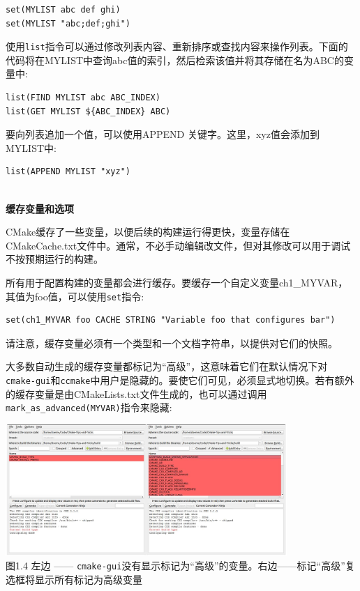 \begin{lstlisting}[style=styleCMake]
set(MYLIST abc def ghi)
set(MYLIST "abc;def;ghi")
\end{lstlisting}

使用\texttt{list}指令可以通过修改列表内容、重新排序或查找内容来操作列表。下面的代码将在MYLIST中查询abc值的索引，然后检索该值并将其存储在名为ABC的变量中:

\begin{lstlisting}[style=styleCMake]
list(FIND MYLIST abc ABC_INDEX)
list(GET MYLIST ${ABC_INDEX} ABC)
\end{lstlisting}

要向列表追加一个值，可以使用APPEND 关键字。这里，xyz值会添加到MYLIST中:

\begin{lstlisting}[style=styleCMake]
list(APPEND MYLIST "xyz")
\end{lstlisting}

\hspace*{\fill} \\ %
\noindent
\textbf{缓存变量和选项}

CMake缓存了一些变量，以便后续的构建运行得更快，变量存储在CMakeCache.txt文件中。通常，不必手动编辑改文件，但对其修改可以用于调试不按预期运行的构建。

所有用于配置构建的变量都会进行缓存。要缓存一个自定义变量ch1\_MYVAR，其值为foo值，可以使用\texttt{set}指令:

\begin{lstlisting}[style=styleCMake]
set(ch1_MYVAR foo CACHE STRING "Variable foo that configures bar")
\end{lstlisting}

请注意，缓存变量必须有一个类型和一个文档字符串，以提供对它们的快照。

大多数自动生成的缓存变量都标记为“高级”，这意味着它们在默认情况下对\texttt{cmake-gui}和\texttt{ccmake}中用户是隐藏的。要使它们可见，必须显式地切换。若有额外的缓存变量是由CMakeLists.txt文件生成的，也可以通过调用\texttt{mark\_as\_advanced(MYVAR)}指令来隐藏:

\begin{center}
\includegraphics[width=0.8\textwidth]{content/1/chapter1/images/4.jpg}\\
图1.4  左边 —— \texttt{cmake-gui}没有显示标记为“高级”的变量。右边——标记“高级”复选框将显示所有标记为高级变量
\end{center}

